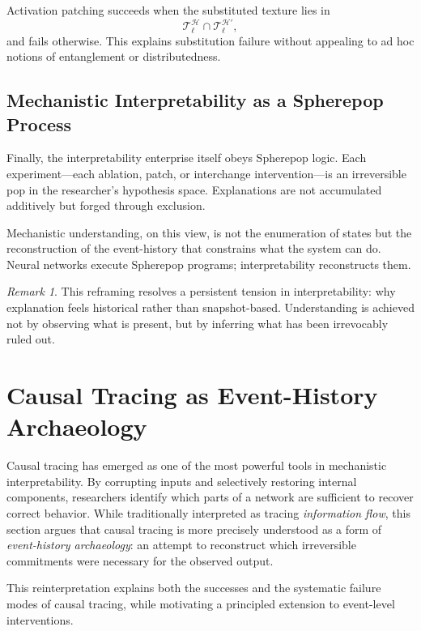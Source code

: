 \documentclass[11pt]{article}
\theoremstyle{remark}
\newtheorem{remark}{Remark}
\newcommand{\Hist}{\mathcal{H}}
\begin{document}
Activation patching succeeds when the substituted texture lies in
\[
\mathcal{T}_\ell^{\Hist} \cap \mathcal{T}_\ell^{\Hist'},
\]
and fails otherwise. This explains substitution failure without
appealing to ad hoc notions of entanglement or distributedness.

\subsection{Mechanistic Interpretability as a Spherepop Process}

Finally, the interpretability enterprise itself obeys Spherepop logic.
Each experiment—each ablation, patch, or interchange intervention—is
an irreversible pop in the researcher's hypothesis space. Explanations
are not accumulated additively but forged through exclusion.

Mechanistic understanding, on this view, is not the enumeration of
states but the reconstruction of the event-history that constrains
what the system can do. Neural networks execute Spherepop programs;
interpretability reconstructs them.

\begin{remark}
This reframing resolves a persistent tension in interpretability:
why explanation feels historical rather than snapshot-based.
Understanding is achieved not by observing what is present, but by
inferring what has been irrevocably ruled out.
\end{remark}

\section{Causal Tracing as Event-History Archaeology}

Causal tracing has emerged as one of the most powerful tools in
mechanistic interpretability. By corrupting inputs and selectively
restoring internal components, researchers identify which parts of a
network are sufficient to recover correct behavior. While traditionally
interpreted as tracing \emph{information flow}, this section argues that
causal tracing is more precisely understood as a form of
\emph{event-history archaeology}: an attempt to reconstruct which
irreversible commitments were necessary for the observed output.

This reinterpretation explains both the successes and the systematic
failure modes of causal tracing, while motivating a principled extension
to event-level interventions.
\end{document}
